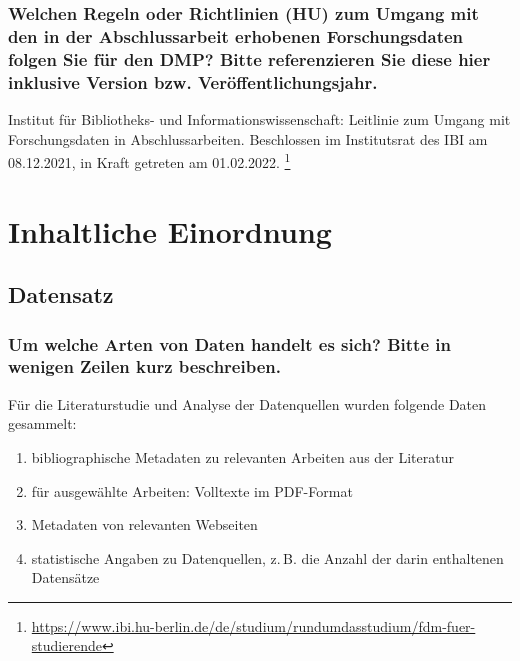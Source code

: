 \subsubsection{Welchen Regeln oder Richtlinien (HU) zum Umgang mit den in der Abschlussarbeit erhobenen Forschungsdaten folgen Sie für den DMP? Bitte referenzieren Sie diese hier inklusive Version bzw. Veröffentlichungsjahr.}

Institut für Bibliotheks- und Informationswissenschaft:
Leitlinie zum Umgang mit Forschungsdaten in Abschlussarbeiten.
Beschlossen im Institutsrat des IBI am 08.12.2021, in Kraft getreten am 01.02.2022.%
\footnote{\url{https://www.ibi.hu-berlin.de/de/studium/rundumdasstudium/fdm-fuer-studierende}}

\section{Inhaltliche Einordnung}


\subsection{Datensatz}

\subsubsection{Um welche Arten von Daten handelt es sich? Bitte in wenigen Zeilen kurz beschreiben.}

Für die Literaturstudie und Analyse der Datenquellen wurden folgende Daten gesammelt:
%
\begin{enumerate}[(1)]
  \item
    bibliographische Metadaten zu relevanten Arbeiten aus der Literatur 
  \item
    für ausgewählte Arbeiten: Volltexte im PDF-Format
  \item
    Metadaten von relevanten Webseiten
  \item
    statistische Angaben zu Datenquellen, z.\,B. die Anzahl der darin enthaltenen Datensätze
\end{enumerate}

